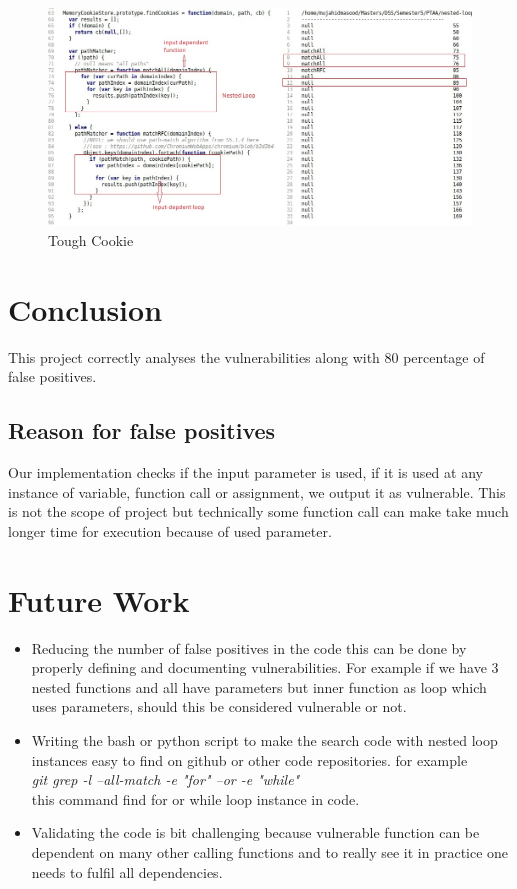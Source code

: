 \documentclass[authoryear,preprint]{sigplanconf}
\begin{document}
\begin{figure}[ht]
\centering
\includegraphics[width=1.2\linewidth]{figures/tough-cookie}
\caption[Tough Cookie]{\label{f:cookie}Tough Cookie}
\end{figure}


\section{Conclusion}

This project correctly analyses the vulnerabilities along with 80 percentage of false positives.

\subsection{Reason for false positives}
Our implementation checks if the input parameter is used, if it is used at any instance of variable, function call or assignment, we output it as vulnerable. This is not the scope of project but technically some function call can make take much longer time for execution because of used parameter.

\section{Future Work}
\begin{itemize}
\item Reducing the number of false positives in the code this can be done by properly defining and documenting vulnerabilities. For example if we have 3 nested functions and all have parameters but inner function as loop which uses parameters, should this be considered vulnerable or not.
\item Writing the bash or python script to make the search code with nested loop instances easy to find on github or other code repositories.
for example \\
 \textit{git grep -l --all-match -e "for" --or -e "while"} \\
this command find for or while loop instance in code.
\item Validating the code is bit challenging because vulnerable function can be dependent on many other calling functions and to really see it in practice one needs to fulfil all dependencies.


\end{itemize}
\end{document}
